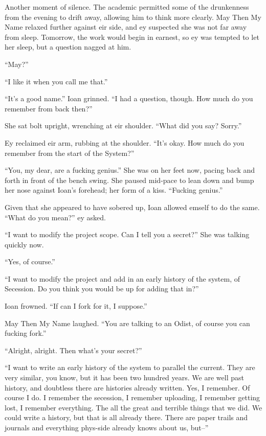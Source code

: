 Another moment of silence. The academic permitted some of the drunkenness from the evening to drift away, allowing him to think more clearly. May Then My Name relaxed further against eir side, and ey suspected she was not far away from sleep. Tomorrow, the work would begin in earnest, so ey was tempted to let her sleep, but a question nagged at him.

``May?''

``I like it when you call me that.''

``It's a good name.'' Ioan grinned. ``I had a question, though. How much do you remember from back then?''

She sat bolt upright, wrenching at eir shoulder. ``What did you say? Sorry.''

Ey reclaimed eir arm, rubbing at the shoulder. ``It's okay. How much do you remember from the start of the System?''

``You, my dear, are a fucking genius.'' She was on her feet now, pacing back and forth in front of the bench swing. She paused mid-pace to lean down and bump her nose against Ioan's forehead; her form of a kiss. ``Fucking genius.''

Given that she appeared to have sobered up, Ioan allowed emself to do the same. ``What do you mean?'' ey asked.

``I want to modify the project scope. Can I tell you a secret?'' She was talking quickly now.

``Yes, of course.''

``I want to modify the project and add in an early history of the system, of Secession. Do you think you would be up for adding that in?''

Ioan frowned. ``If can I fork for it, I suppose.''

May Then My Name laughed. ``You are talking to an Odist, of course you can fucking fork.''

``Alright, alright. Then what's your secret?''

``I want to write an early history of the system to parallel the current. They are very similar, you know, but it has been two hundred years. We are well past history, and doubtless there are histories already written. Yes, I remember. Of course I do. I remember the secession, I remember uploading, I remember getting lost, I remember everything. The all the great and terrible things that we did. We could write a history, but that is all already there. There are paper trails and journals and everything phys-side already knows about us, but--''

